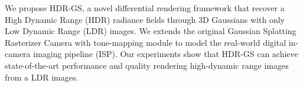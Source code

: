 We propose HDR-GS, a novel differential rendering framework 
that recover a High Dynamic Range (HDR) radiance fields through
3D Gaussians with only Low Dynamic Range (LDR) images.
We extends the original Gaussian Splatting Rasterizer Camera 
with tone-mapping module to model the real-world digital in-camera 
imaging pipeline (ISP). Our experiments show that HDR-GS 
can achieve state-of-the-art performance and quality rendering 
high-dynamic range images from a LDR images.
